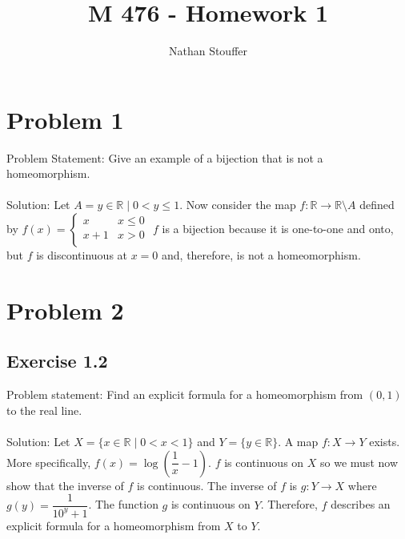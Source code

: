 \documentclass{article}
\begin{document}
	
\title{M 476 - Homework 1}
\author{Nathan Stouffer}

\maketitle
\newpage

\section*{Problem 1}
Problem Statement: Give an example of a bijection that is not a homeomorphism. \\\\
Solution: Let $A= {y \in \mathbb{R} \mid 0 < y \leq 1}$. Now consider the map $f: \mathbb{R} \to \mathbb{R} \setminus A$ defined by $f(x)= 
\begin{cases} 
x & x\leq 0 \\
x + 1 & x > 0 \\
\end{cases} $
$f$ is a bijection because it is one-to-one and onto, but $f$ is discontinuous at $x=0$ and, therefore, is not a homeomorphism.
\newpage

\section*{Problem 2}
\subsection*{Exercise 1.2}
Problem statement: Find an explicit formula for a homeomorphism from $(0,1)$ to the real line. \\\\
Solution: Let $X=\{x \in \mathbb{R} \mid 0<x<1\}$ and $Y=\{ y \in \mathbb{R}\}.$ A map $f: X \to Y$ exists. More specifically, $f(x)= \log (\dfrac{1}{x} - 1)$. $f$ is continuous on $X$ so we must now show that the inverse of $f$ is continuous. The inverse of $f$ is $g: Y \to X$ where $g(y)= \dfrac{1}{10^y + 1}$. The function $g$ is continuous on $Y$. Therefore, $f$ describes an explicit formula for a homeomorphism from $X$ to $Y$.
\end{document}
